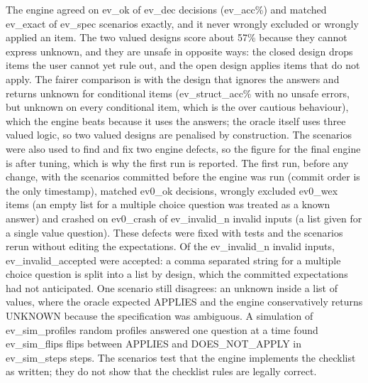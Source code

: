 \documentclass[conference]{IEEEtran}
\begin{document}
The engine agreed on {{ev_ok}} of {{ev_dec}} decisions ({{ev_acc}}\%) and matched {{ev_exact}} of {{ev_spec}} scenarios exactly, and it never wrongly excluded or wrongly applied an item. The two valued designs score about 57\% because they cannot express unknown, and they are unsafe in opposite ways: the closed design drops items the user cannot yet rule out, and the open design applies items that do not apply. The fairer comparison is with the design that ignores the answers and returns unknown for conditional items ({{ev_struct_acc}}\% with no unsafe errors, but unknown on every conditional item, which is the over cautious behaviour), which the engine beats because it uses the answers; the oracle itself uses three valued logic, so two valued designs are penalised by construction. The scenarios were also used to find and fix two engine defects, so the figure for the final engine is after tuning, which is why the first run is reported. The first run, before any change, with the scenarios committed before the engine was run (commit order is the only timestamp), matched {{ev0_ok}} decisions, wrongly excluded {{ev0_wex}} items (an empty list for a multiple choice question was treated as a known answer) and crashed on {{ev0_crash}} of {{ev_invalid_n}} invalid inputs (a list given for a single value question). These defects were fixed with tests and the scenarios rerun without editing the expectations. Of the {{ev_invalid_n}} invalid inputs, {{ev_invalid_accepted}} were accepted: a comma separated string for a multiple choice question is split into a list by design, which the committed expectations had not anticipated. One scenario still disagrees: an unknown inside a list of values, where the oracle expected APPLIES and the engine conservatively returns UNKNOWN because the specification was ambiguous. A simulation of {{ev_sim_profiles}} random profiles answered one question at a time found {{ev_sim_flips}} flips between APPLIES and DOES\_NOT\_APPLY in {{ev_sim_steps}} steps. The scenarios test that the engine implements the checklist as written; they do not show that the checklist rules are legally correct.
\end{document}
